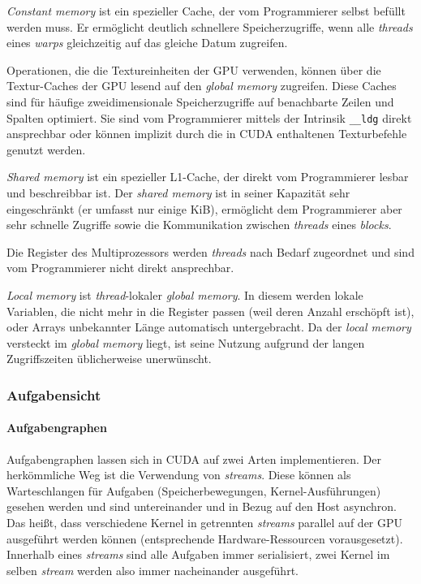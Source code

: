 \textit{Constant memory} ist ein spezieller Cache, der vom Programmierer selbst
befüllt werden muss. Er ermöglicht deutlich schnellere Speicherzugriffe, wenn
alle \textit{threads} eines \textit{warps} gleichzeitig auf das gleiche Datum
zugreifen.

Operationen, die die Textureinheiten der GPU verwenden, können über die
Textur-Caches der GPU lesend auf den \textit{global memory} zugreifen. Diese
Caches sind für häufige zweidimensionale Speicherzugriffe auf benachbarte Zeilen
und Spalten optimiert. Sie sind vom Programmierer mittels der Intrinsik
\texttt{\_\_ldg} direkt ansprechbar oder können implizit durch die in CUDA
enthaltenen Texturbefehle genutzt werden.

\textit{Shared memory} ist ein spezieller L1-Cache, der direkt vom Programmierer
lesbar und beschreibbar ist. Der \textit{shared memory} ist in seiner Kapazität
sehr eingeschränkt (er umfasst nur einige KiB), ermöglicht dem Programmierer
aber sehr schnelle Zugriffe sowie die Kommunikation zwischen \textit{threads}
eines \textit{blocks}.

Die Register des Multiprozessors werden \textit{threads} nach Bedarf zugeordnet
und sind vom Programmierer nicht direkt ansprechbar.

\textit{Local memory} ist \textit{thread}-lokaler \textit{global memory}. In
diesem werden lokale Variablen, die nicht mehr in die Register passen
(weil deren Anzahl erschöpft ist), oder Arrays unbekannter Länge automatisch
untergebracht. Da der \textit{local memory} versteckt im \textit{global memory}
liegt, ist seine Nutzung aufgrund der langen Zugriffszeiten üblicherweise
unerwünscht.

\subsubsection{Aufgabensicht}

\paragraph{Aufgabengraphen}

Aufgabengraphen lassen sich in CUDA auf zwei Arten implementieren. Der
herkömmliche Weg ist die Verwendung von \textit{streams}. Diese können als
Warteschlangen für Aufgaben (Speicherbewegungen, Kernel-Ausführungen) gesehen
werden und sind untereinander und in Bezug auf den Host asynchron. Das heißt,
dass verschiedene Kernel in getrennten \textit{streams} parallel auf der GPU
ausgeführt werden können (entsprechende Hardware-Ressourcen vorausgesetzt).
Innerhalb eines \textit{streams} sind alle Aufgaben immer serialisiert, zwei
Kernel im selben \textit{stream} werden also immer nacheinander ausgeführt.


